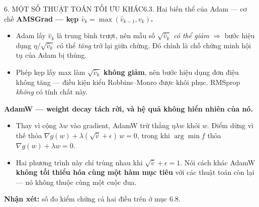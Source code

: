 \documentclass[aspectratio=169,11pt]{beamer}
\newcommand{\nx}{\textbf{Nhận xét:}}
\begin{document}
\begin{frame}{6. MỘT SỐ THUẬT TOÁN TỐI ƯU KHÁC}{6.3. Hai biến thể của Adam --- cơ chế}
  \small
  \textbf{AMSGrad --- kẹp $\hat v_k=\max(\hat v_{k-1},v_k)$.}
  \begin{itemize}\footnotesize
    \item Adam lấy $\hat v_k$ là trung bình trượt, nên mẫu số $\sqrt{\hat v_k}$ \emph{có thể giảm}
          $\Rightarrow$ bước hiệu dụng $\eta/\sqrt{\hat v_k}$ có thể \emph{tăng} trở lại giữa chừng.
          Đó chính là chỗ chứng minh hội tụ của Adam bị thủng.
    \item Phép kẹp lấy max làm $\sqrt{\hat v_k}$ \textbf{không giảm}, nên bước hiệu dụng đơn điệu
          không tăng --- điều kiện kiểu Robbins--Monro được khôi phục. RMSprop \emph{không} có
          tính chất này.
  \end{itemize}
  \vspace{2pt}
  \textbf{AdamW --- weight decay tách rời, và hệ quả không hiển nhiên của nó.}
  \begin{itemize}\footnotesize
    \item Thay vì cộng $\lambda w$ vào gradient, AdamW trừ thẳng $\eta\lambda w$ khỏi $w$. Điểm
          dừng vì thế thỏa $\nabla g(w)+\lambda(\sqrt{\hat v}+\epsilon)\,w=0$, trong khi
          $\arg\min f$ thỏa $\nabla g(w)+\lambda w=0$.
    \item Hai phương trình này chỉ trùng nhau khi $\sqrt{\hat v}+\epsilon=1$. Nói cách khác AdamW
          \textbf{không tối thiểu hóa cùng một hàm mục tiêu} với các thuật toán còn lại --- nó
          không thuộc cùng một cuộc đua.
  \end{itemize}
  \vspace{2pt}
  {\footnotesize\nx{} số đo kiểm chứng cả hai điều trên ở mục 6.8.}
\end{frame}
\end{document}
